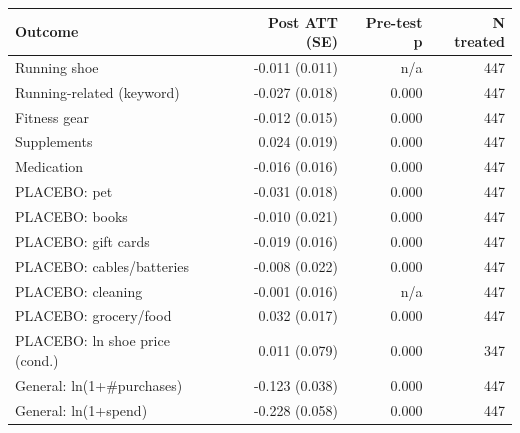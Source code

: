 \begin{tabular}{lrrr}
\toprule
Outcome & Post ATT (SE) & Pre-test p & N treated \\
\midrule
Running shoe & -0.011 (0.011) & n/a & 447 \\
Running-related (keyword) & -0.027 (0.018) & 0.000 & 447 \\
Fitness gear & -0.012 (0.015) & 0.000 & 447 \\
Supplements & 0.024 (0.019) & 0.000 & 447 \\
Medication & -0.016 (0.016) & 0.000 & 447 \\
PLACEBO: pet & -0.031 (0.018) & 0.000 & 447 \\
PLACEBO: books & -0.010 (0.021) & 0.000 & 447 \\
PLACEBO: gift cards & -0.019 (0.016) & 0.000 & 447 \\
PLACEBO: cables/batteries & -0.008 (0.022) & 0.000 & 447 \\
PLACEBO: cleaning & -0.001 (0.016) & n/a & 447 \\
PLACEBO: grocery/food & 0.032 (0.017) & 0.000 & 447 \\
PLACEBO: ln shoe price (cond.) & 0.011 (0.079) & 0.000 & 347 \\
General: ln(1+\#purchases) & -0.123 (0.038) & 0.000 & 447 \\
General: ln(1+spend) & -0.228 (0.058) & 0.000 & 447 \\
\bottomrule
\end{tabular}
